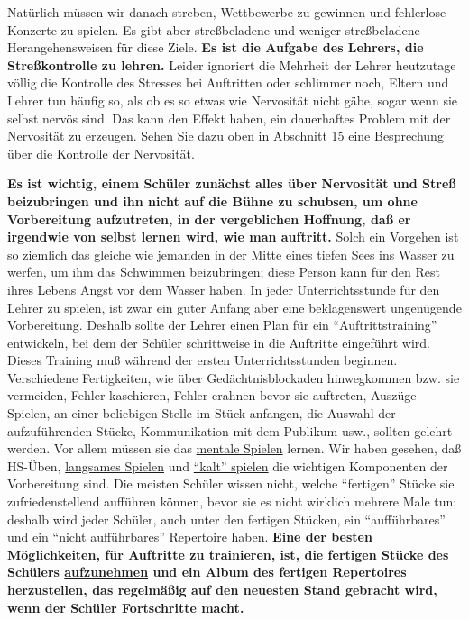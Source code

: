 Natürlich müssen wir danach streben, Wettbewerbe zu gewinnen und fehlerlose Konzerte zu spielen.
Es gibt aber streßbeladene und weniger streßbeladene Herangehensweisen für diese Ziele.
\textbf{Es ist die Aufgabe des Lehrers, die Streßkontrolle zu lehren.}
Leider ignoriert die Mehrheit der Lehrer heutzutage völlig die Kontrolle des Stresses bei Auftritten oder schlimmer noch, Eltern und Lehrer tun häufig so, als ob es so etwas wie Nervosität nicht gäbe, sogar wenn sie selbst nervös sind.
Das kann den Effekt haben, ein dauerhaftes Problem mit der Nervosität zu erzeugen.
Sehen Sie dazu oben in Abschnitt 15 eine Besprechung über die \hyperlink{c1iii15}{Kontrolle der Nervosität}.

\textbf{Es ist wichtig, einem Schüler zunächst alles über Nervosität und Streß beizubringen und
ihn nicht auf die Bühne zu schubsen, um ohne Vorbereitung aufzutreten, in der vergeblichen Hoffnung, daß er irgendwie von selbst lernen wird, wie man auftritt.}
Solch ein Vorgehen ist so ziemlich das gleiche wie jemanden in der Mitte eines tiefen Sees ins Wasser zu werfen, um ihm das Schwimmen beizubringen; diese Person kann für den Rest ihres Lebens Angst vor dem Wasser haben.
In jeder Unterrichtsstunde für den Lehrer zu spielen, ist zwar ein guter Anfang aber eine beklagenswert ungenügende Vorbereitung.
Deshalb sollte der Lehrer einen Plan für ein \enquote{Auftrittstraining} entwickeln, bei dem der Schüler schrittweise in die Auftritte eingeführt wird.
Dieses Training muß während der ersten Unterrichtsstunden beginnen.
Verschiedene Fertigkeiten, wie über Gedächtnisblockaden hinwegkommen bzw. sie vermeiden, Fehler kaschieren, Fehler erahnen bevor sie auftreten, Auszüge-Spielen, an einer beliebigen Stelle im Stück anfangen, die Auswahl der aufzuführenden Stücke, Kommunikation mit dem Publikum usw., sollten gelehrt werden.
Vor allem müssen sie das \hyperlink{c1ii12mental}{mentale Spielen} lernen.
Wir haben gesehen, daß HS-Üben, \hyperlink{c1ii17}{langsames Spielen} und \hyperlink{c1iii6g}{\enquote{kalt} spielen} die wichtigen Komponenten der Vorbereitung sind.
Die meisten Schüler wissen nicht, welche \enquote{fertigen} Stücke sie zufriedenstellend aufführen können, bevor sie es nicht wirklich mehrere Male tun; deshalb wird jeder Schüler, auch unter den fertigen Stücken, ein \enquote{aufführbares} und ein \enquote{nicht aufführbares} Repertoire haben.
\textbf{Eine der besten Möglichkeiten, für Auftritte zu trainieren, ist, die fertigen Stücke des Schülers \hyperlink{c1iii13}{aufzunehmen} und ein Album des fertigen Repertoires herzustellen, das regelmäßig auf den neuesten Stand gebracht wird, wenn der Schüler Fortschritte macht.}
